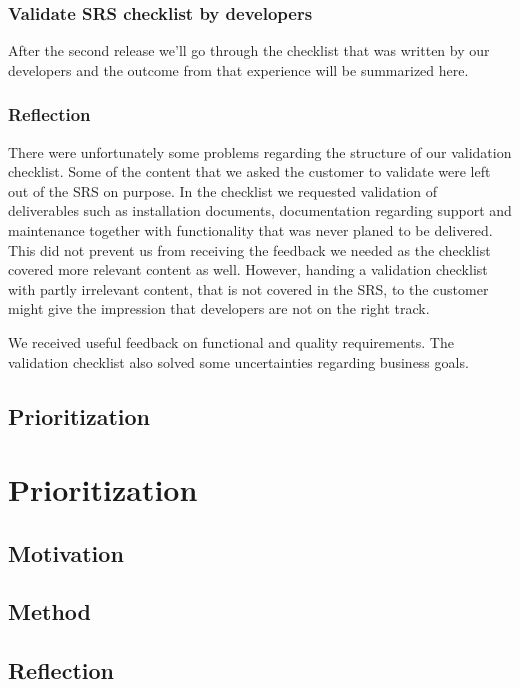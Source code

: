 \documentclass[10pt]{article}
\begin{document}
\subsubsection{Validate SRS checklist by developers}
After the second release we'll go through the checklist that was written by our developers and the outcome from that experience will be summarized here.

\subsubsection{Reflection}
There were unfortunately some problems regarding the structure of our validation checklist. Some of the content that we asked the customer to validate were left out of the SRS on purpose. In the checklist we requested validation of deliverables such as installation documents, documentation regarding support and maintenance together with functionality that was never planed to be delivered.
This did not prevent us from receiving the feedback we needed as the checklist covered more relevant content as well. However, handing a validation checklist with partly irrelevant content, that is not covered in the SRS, to the customer might give the impression that developers are not on the right track. 

We received useful feedback on functional and quality requirements. The validation checklist also solved some uncertainties regarding business goals.



\subsection{Prioritization}

\section{Prioritization}

\subsection{Motivation}
\subsection{Method}
\subsection{Reflection}
\end{document}
